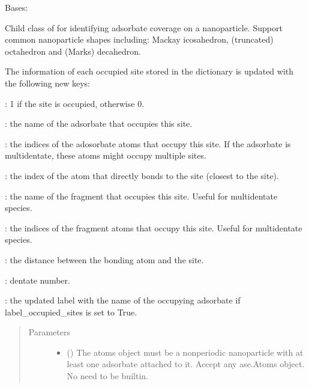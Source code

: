 \documentclass[letterpaper,10pt,english]{sphinxmanual}
\begin{document}
\begin{fulllineitems}
\label{\detokenize{modules:acat.adsorbate_coverage.ClusterAdsorbateCoverage}}
Bases: 

Child class of  for identifying adsorbate
coverage on a nanoparticle. Support common nanoparticle shapes
including: Mackay icosahedron, (truncated) octahedron and (Marks)
decahedron.

The information of each occupied site stored in the dictionary is
updated with the following new keys:

: 1 if the site is occupied, otherwise 0.

: the name of the adsorbate that occupies this site.

: the indices of the adosorbate atoms that occupy
this site. If the adsorbate is multidentate, these atoms might
occupy multiple sites.

: the index of the atom that directly bonds to the
site (closest to the site).

: the name of the fragment that occupies this site. Useful
for multidentate species.

: the indices of the fragment atoms that occupy
this site. Useful for multidentate species.

: the distance between the bonding atom and the site.

: dentate number.

: the updated label with the name of the occupying adsorbate
if label\_occupied\_sites is set to True.
\begin{quote}\begin{description}
\item[{Parameters}] \leavevmode\begin{itemize}
\item {} 
 () \textendash{} The atoms object must be a non\sphinxhyphen{}periodic nanoparticle with at
least one adsorbate attached to it. Accept any ase.Atoms object.
No need to be built\sphinxhyphen{}in.


\end{itemize}
\end{description}
\end{quote}
\end{fulllineitems}
\end{document}
